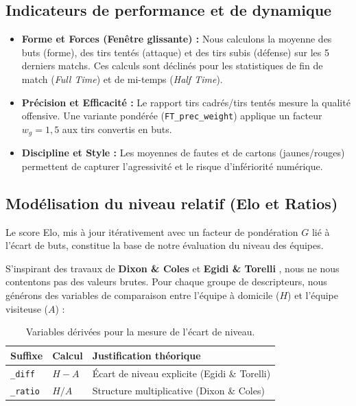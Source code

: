 \subsection{Indicateurs de performance et de dynamique}
\begin{itemize}
    \item \textbf{Forme et Forces (Fenêtre glissante) :} Nous calculons la moyenne 
    des buts (forme), des tirs tentés (attaque) et des tirs subis (défense) sur les 
    5 derniers matchs. Ces calculs sont déclinés pour les statistiques de fin de 
    match (\textit{Full Time}) et de mi-temps (\textit{Half Time}).
    \item \textbf{Précision et Efficacité :} Le rapport tirs cadrés/tirs tentés 
    mesure la qualité offensive. Une variante pondérée (\texttt{FT\_prec\_weight}) 
    applique un facteur $w_g = 1{,}5$ aux tirs convertis en buts.
    \item \textbf{Discipline et Style :} Les moyennes de fautes et de cartons 
    (jaunes/rouges) permettent de capturer l'agressivité et le risque d'infériorité 
    numérique.
\end{itemize}

\subsection{Modélisation du niveau relatif (Elo et Ratios)}
Le score Elo, mis à jour itérativement avec un facteur de pondération $G$ lié à 
l'écart de buts, constitue la base de notre évaluation du niveau des équipes. 

S'inspirant des travaux de \textbf{Dixon \& Coles} \cite{dixon} et 
\textbf{Egidi \& Torelli} \cite{egidi}, nous ne nous contentons pas des valeurs 
brutes. Pour chaque groupe de descripteurs, nous générons des variables de 
comparaison entre l'équipe à domicile ($H$) et l'équipe visiteuse ($A$) :
\begin{table}[h!]
    \centering
    \begin{tabular}{lll}
        \hline
        \textbf{Suffixe} & \textbf{Calcul} & \textbf{Justification théorique} \\ \hline
        \texttt{\_diff} & $H - A$ & Écart de niveau explicite (Egidi \& Torelli) \\
        \texttt{\_ratio} & $H / A$ & Structure multiplicative (Dixon \& Coles) \\
    \end{tabular}
    \caption{Variables dérivées pour la mesure de l'écart de niveau.}
\end{table}

